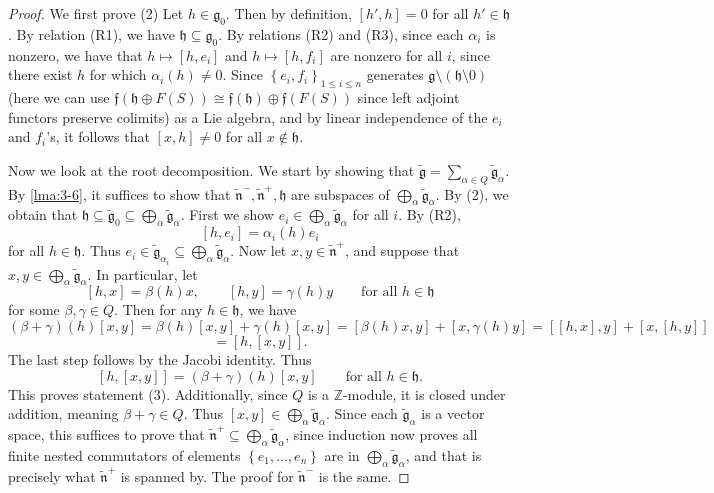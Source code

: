 \documentclass[11pt, letterpaper]{article}
\theoremstyle{plain}
\begin{document}
\begin{proof}
	We first prove (2) Let $h\in \mathfrak{g} _0$. Then by definition, $[h',h]=0$ for all $h'\in \mathfrak{h} $. By relation (R1), we have $\mathfrak{h} \subseteq \mathfrak{g} _0$. By relations (R2) and (R3), since each $\alpha _i$ is nonzero, we have that $h\mapsto [h,e_i]$ and $h\mapsto [h,f_i]$ are nonzero for all $i$, since there exist $h$ for which $\alpha _i(h)\neq 0$. Since $\left\{ e_i,f_i \right\}_{1\leq i\leq n} $ generates $\mathfrak{g} \setminus (\mathfrak{h}\setminus 0) $ (here we can use $\mathfrak{f} (\mathfrak{h} \oplus F(S)) \cong \mathfrak{f} (\mathfrak{h} )\oplus \mathfrak{f} (F(S))$ since left adjoint functors preserve colimits) as a Lie algebra, and by linear independence of the $e_i$ and $f_i$'s, it follows that $[x,h]\neq 0$ for all $x\notin \mathfrak{h} $.

	Now we look at the root decomposition. We start by showing that $\widetilde{\mathfrak{g} } = \sum_{\alpha \in Q} \widetilde{\mathfrak{g} }_\alpha $. By \cref{lma:3-6}, it suffices to show that $\widetilde{\mathfrak{n} } ^-, \widetilde{\mathfrak{n} } ^+, \mathfrak{h} $ are subspaces of $\bigoplus_{\alpha } \widetilde{\mathfrak{g} }_\alpha $. By (2), we obtain that $\mathfrak{h} \subseteq \widetilde{\mathfrak{g} }_0 \subseteq \bigoplus_{\alpha } \widetilde{\mathfrak{g} }_\alpha $. First we show $e_i\in \bigoplus_{\alpha } \widetilde{\mathfrak{g} }_\alpha $ for all $i$. By (R2),
	\[
		[h,e_i] = \alpha _i(h)e_i
	\]
	for all $h\in \mathfrak{h} $. Thus $e_i \in \widetilde{\mathfrak{g} }_{\alpha _i} \subseteq \bigoplus_{\alpha } \widetilde{\mathfrak{g} } _{\alpha } $. Now let $x,y\in \widetilde{\mathfrak{n} } ^+$, and suppose that $x,y\in \bigoplus_{\alpha } \widetilde{\mathfrak{g} } _\alpha $. In particular, let
	\[
		[h,x]=\beta (h)x,\qquad [h,y]=\gamma (h)y\qquad \text{for all } h\in \mathfrak{h} 
	\]
	for some $\beta ,\gamma \in Q$. Then for any $h\in \mathfrak{h} $, we have
	\[
		(\beta +\gamma )(h)[x,y] = \beta (h)[x,y] + \gamma (h)[x,y] = [\beta (h)x,y] + [x,\gamma (h)y]=[[h,x],y] + [x,[h,y]]
	\]
	\[
		=[h,[x,y]]
	.\]
	The last step follows by the Jacobi identity. Thus
	\[
		[h,[x,y]] = (\beta +\gamma )(h)[x,y]\qquad \text{for all } h\in \mathfrak{h} 
	.\]
	This proves statement (3). Additionally, since $Q$ is a $\mathbb{Z} $-module, it is closed under addition, meaning $\beta +\gamma \in Q$. Thus $[x,y]\in \bigoplus_{\alpha } \widetilde{\mathfrak{g} } _\alpha $. Since each $\widetilde{\mathfrak{g} }_{\alpha } $ is a vector space, this suffices to prove that $\widetilde{\mathfrak{n} } ^+ \subseteq \bigoplus_{\alpha } \widetilde{\mathfrak{g} } _\alpha $, since induction now proves all finite nested commutators of elements $\left\{ e_1, \ldots ,e_n \right\} $ are in $\bigoplus_{\alpha } \widetilde{\mathfrak{g} }_\alpha $, and that is precisely what $\widetilde{\mathfrak{n} } ^+$ is spanned by. The proof for $\widetilde{\mathfrak{n} } ^-$ is the same.


\end{proof}
\end{document}
